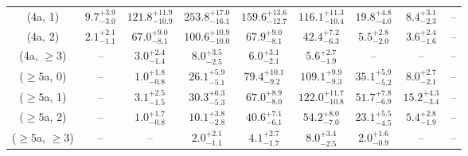 \begin{table}[h!]
{\begin{tabular}{ccccccccc}
	(4a, 1) & $9.7^{+ 3.9 }_{- 3.0 }$ & $121.8^{+ 11.9 }_{- 10.9 }$ & $253.8^{+ 17.0 }_{- 16.1 }$ & $159.6^{+ 13.6 }_{- 12.7 }$ & $116.1^{+ 11.3 }_{- 10.4 }$ & $19.8^{+ 4.8 }_{- 4.0 }$ & $8.4^{+ 3.1 }_{- 2.3 }$ & -- \\[0.5ex] 
	(4a, 2) & $2.1^{+ 2.1 }_{- 1.1 }$ & $67.0^{+ 9.0 }_{- 8.1 }$ & $100.6^{+ 10.9 }_{- 10.0 }$ & $67.9^{+ 9.0 }_{- 8.1 }$ & $42.4^{+ 7.2 }_{- 6.3 }$ & $5.5^{+ 2.8 }_{- 2.0 }$ & $3.6^{+ 2.4 }_{- 1.6 }$ & -- \\[0.5ex] 
	(4a, $\ge3$) & -- & $3.0^{+ 2.4 }_{- 1.4 }$ & $8.0^{+ 3.5 }_{- 2.5 }$ & $6.0^{+ 3.1 }_{- 2.1 }$ & $5.6^{+ 2.7 }_{- 1.9 }$ & -- & -- & -- \\[0.5ex] 
	($\ge5$a, 0) & -- & $1.0^{+ 1.8 }_{- 0.8 }$ & $26.1^{+ 5.9 }_{- 5.1 }$ & $79.4^{+ 10.1 }_{- 9.2 }$ & $109.1^{+ 9.9 }_{- 9.3 }$ & $35.1^{+ 5.9 }_{- 5.2 }$ & $8.0^{+ 2.7 }_{- 2.1 }$ & -- \\[0.5ex] 
	($\ge5$a, 1) & -- & $3.1^{+ 2.5 }_{- 1.5 }$ & $30.3^{+ 6.3 }_{- 5.3 }$ & $67.0^{+ 8.9 }_{- 8.0 }$ & $122.0^{+ 11.7 }_{- 10.8 }$ & $51.7^{+ 7.8 }_{- 6.9 }$ & $15.2^{+ 4.3 }_{- 3.4 }$ & -- \\[0.5ex] 
	($\ge5$a, 2) & -- & $1.0^{+ 1.7 }_{- 0.8 }$ & $10.1^{+ 3.8 }_{- 2.8 }$ & $40.6^{+ 7.1 }_{- 6.1 }$ & $54.2^{+ 8.0 }_{- 7.0 }$ & $23.1^{+ 5.5 }_{- 4.5 }$ & $5.4^{+ 2.8 }_{- 1.9 }$ & -- \\[0.5ex] 
	($\ge5$a, $\ge3$) & -- & -- & $2.0^{+ 2.1 }_{- 1.1 }$ & $4.1^{+ 2.7 }_{- 1.7 }$ & $8.0^{+ 3.4 }_{- 2.5 }$ & $2.0^{+ 1.6 }_{- 0.9 }$ & -- & -- \\[0.5ex] 
	\hline
	\hline
\end{tabular}}
\end{table}
